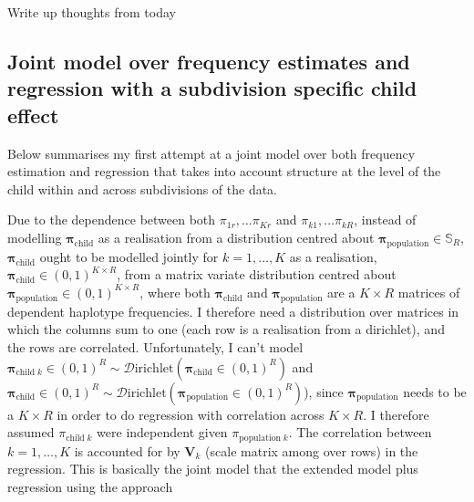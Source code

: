 \documentclass[letterpaper]{article}
\begin{document}
Write up thoughts from today


\subsection{Joint model over frequency estimates and regression with a subdivision specific child effect}

Below summarises my first attempt at a joint model over both frequency estimation and regression that takes into account structure at the level of the child within and across subdivisions of the data. 

Due to the dependence between both $\pi_{1 r},  \ldots \pi_{K r}$ and $\pi_{k 1},  \ldots \pi_{k R}$,  instead of modelling $\bm{\pi}_{\text{child} }$ as a realisation from a distribution centred about $\bm{\pi}_{\text{population}} \in \mathbb{S}_{R}$, $\bm{\pi}_{\text{child} }$ ought to be modelled jointly for $k = 1, \ldots, K$ as a realisation, $\bm{\pi}_{\text{child}} \in (0,1)^{K \times R}$, from a matrix variate distribution centred about $\bm{\pi}_{\text{population}} \in (0,1)^{K \times R}$, where both $\bm{\pi}_{\text{child}}$ and $\bm{\pi}_{\text{population}}$ are a $K \times R$ matrices of dependent haplotype frequencies. I therefore need a distribution over matrices in which the columns sum to one (each row is a realisation from a dirichlet), and the rows are correlated. Unfortunately, I can't model $\bm{\pi}_{\text{child} \; k} \in (0,1)^R \sim \mathcal{D}\text{irichlet}(\bm{\pi}_{\text{child}} \in (0,1)^R)$ and $\bm{\pi}_{\text{child}} \in (0,1)^R \sim \mathcal{D}\text{irichlet}(\bm{\pi}_{\text{population}} \in (0,1)^R)$), since $\bm{\pi}_{\text{population}}$ needs to be a ${K \times R}$ in order to do regression with correlation across $K \times R$. I therefore assumed $\pi_{\text{child}\; k}$ were independent given $\pi_{\text{population}\; k}$. The correlation between $k = 1,\ldots, K$ is accounted for by $\bm{V}_k$ (scale matrix among over rows) in the regression. This is basically the joint model that the extended model plus regression using the approach  
\end{document}
